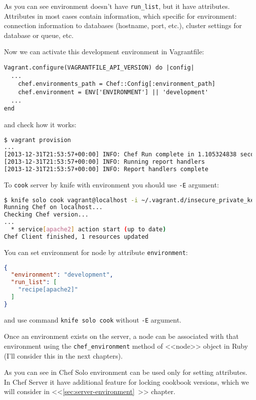 As you can see environment doesn't have \lstinline!run_list!, but it have attributes. Attributes in most cases contain information, which specific for environment: connection information to databases (hostname, port, etc.), cluster settings for database or queue, etc.

Now we can activate this development environment in Vagrantfile:

\begin{lstlisting}[label=lst:my-cloud-chef-environment2,title=my-cloud/Vagrantfile]
Vagrant.configure(VAGRANTFILE_API_VERSION) do |config|
  ...
    chef.environments_path = Chef::Config[:environment_path]
    chef.environment = ENV['ENVIRONMENT'] || 'development'
  ...
end
\end{lstlisting}

and check how it works:

\begin{lstlisting}[language=Bash,label=lst:my-cloud-chef-environment3]
$ vagrant provision
...
[2013-12-31T21:53:57+00:00] INFO: Chef Run complete in 1.105324838 seconds
[2013-12-31T21:53:57+00:00] INFO: Running report handlers
[2013-12-31T21:53:57+00:00] INFO: Report handlers complete
\end{lstlisting}

To \lstinline!cook! server by knife with environment you should use \lstinline!-E! argument:

\begin{lstlisting}[language=Bash,label=lst:my-cloud-chef-environment4]
$ knife solo cook vagrant@localhost -i ~/.vagrant.d/insecure_private_key -p 2222 -N web1.example.com -E development
Running Chef on localhost...
Checking Chef version...
...
  * service[apache2] action start (up to date)
Chef Client finished, 1 resources updated
\end{lstlisting}

You can set environment for node by attribute \lstinline!environment!:

\begin{lstlisting}[language=JSON,label=lst:my-cloud-chef-environment5,title=my-cloud/nodes/web1.example.com.json]
{
  "environment": "development",
  "run_list": [
    "recipe[apache2]"
  ]
}
\end{lstlisting}

and use command \lstinline!knife solo cook! without \lstinline!-E! argument.

Once an environment exists on the server, a node can be associated with that environment using the \lstinline!chef_environment! method of <<node>> object in Ruby (I'll consider this in the next chapters).

As you can see in Chef Solo environment can be used only for setting attributes. In Chef Server it have additional feature for locking cookbook versions, which we will consider in <<\ref{sec:server-environment}~>> chapter.
